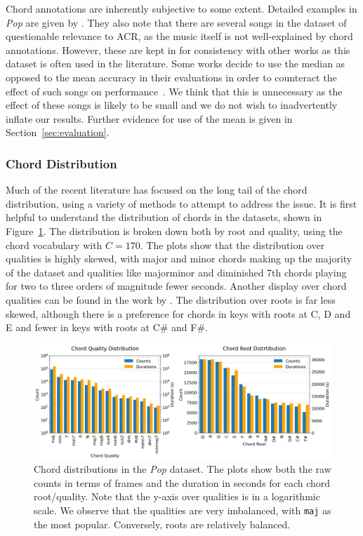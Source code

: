 Chord annotations are inherently subjective to some extent. Detailed examples in \emph{Pop} are given by \citet{FourTimelyInsights}. They also note that there are several songs in the dataset of questionable relevance to ACR, as the music itself is not well-explained by chord annotations. However, these are kept in for consistency with other works as this dataset is often used in the literature. Some works decide to use the median as opposed to the mean accuracy in their evaluations in order to counteract the effect of such songs on performance~\citep{StructuredTraining}. We think that this is unnecessary as the effect of these songs is likely to be small and we do not wish to inadvertently inflate our results. Further evidence for use of the mean is given in Section~\ref{sec:evaluation}.

\subsubsection{Chord Distribution}

Much of the recent literature has focused on the long tail of the chord distribution, using a variety of methods to attempt to address the issue. It is first helpful to understand the distribution of chords in the datasets, shown in Figure~\ref{fig:chord-distribution}. The distribution is broken down both by root and quality, using the chord vocabulary with $C=170$. The plots show that the distribution over qualities is highly skewed, with major and minor chords making up the majority of the dataset and qualities like majorminor and diminished 7th chords playing for two to three orders of magnitude fewer seconds. Another display over chord qualities can be found in the work by \citet{ACRLargeVocab1}. The distribution over roots is far less skewed, although there is a preference for chords in keys with roots at C, D and E and fewer in keys with roots at C\# and F\#.

\begin{figure}[H]
    \centering
    \includegraphics[width=1.0\textwidth]{figures/chord_distribution.png}
    \caption{Chord distributions in the \emph{Pop} dataset. The plots show both the raw counts in terms of frames and the duration in seconds for each chord root/quality. Note that the y-axis over qualities is in a logarithmic scale. We observe that the qualities are very imbalanced, with \texttt{maj} as the most popular. Conversely, roots are relatively balanced.}\label{fig:chord-distribution}
\end{figure}


